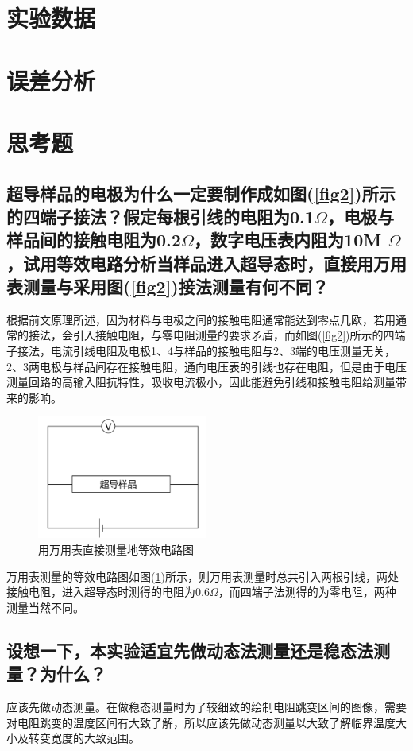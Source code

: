 \documentclass[a4paper]{article}
\begin{document}
\section{实验数据}

\section{误差分析}

\section{思考题}
\subsection{超导样品的电极为什么一定要制作成如图(\ref{fig2})所示的四端子接法？假定每根引线的电阻为0.1$\Omega$，电极与样品间的接触电阻为0.2$\Omega$，数字电压表内阻为10M $\Omega$，试用等效电路分析当样品进入超导态时，直接用万用表测量与采用图(\ref{fig2})接法测量有何不同？}
根据前文原理所述，因为材料与电极之间的接触电阻通常能达到零点几欧，若用通常的接法，会引入接触电阻，与零电阻测量的要求矛盾，而如图(\ref{fig2})所示的四端子接法，电流引线电阻及电极1、4与样品的接触电阻与2、3端的电压测量无关，2、3两电极与样品间存在接触电阻，通向电压表的引线也存在电阻，但是由于电压测量回路的高输入阻抗特性，吸收电流极小，因此能避免引线和接触电阻给测量带来的影响。
\begin{figure}[!h]
\centering
\includegraphics[width=0.5\textwidth]{fig/quesfig1.pdf}
\caption{用万用表直接测量地等效电路图}\label{quesfig1}
\end{figure}

万用表测量的等效电路图如图(\ref{quesfig1})所示，则万用表测量时总共引入两根引线，两处接触电阻，进入超导态时测得的电阻为0.6$\Omega$，而四端子法测得的为零电阻，两种测量当然不同。
\subsection{设想一下，本实验适宜先做动态法测量还是稳态法测量？为什么？}
应该先做动态测量。在做稳态测量时为了较细致的绘制电阻跳变区间的图像，需要对电阻跳变的温度区间有大致了解，所以应该先做动态测量以大致了解临界温度大小及转变宽度的大致范围。
\end{document}

